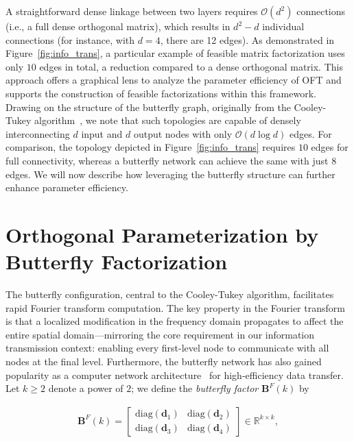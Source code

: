A straightforward dense linkage between two layers requires $\mathcal{O}(d^2)$ connections (i.e., a full dense orthogonal matrix), which results in $d^2-d$ individual connections (for instance, with $d=4$, there are 12 edges). As demonstrated in Figure~\ref{fig:info_trans}, a particular example of feasible matrix factorization uses only $10$ edges in total, a reduction compared to a dense orthogonal matrix. This approach offers a graphical lens to analyze the parameter efficiency of OFT and supports the construction of feasible factorizations within this framework. Drawing on the structure of the butterfly graph, originally from the Cooley-Tukey algorithm~\cite{cooley1965algorithm}, we note that such topologies are capable of densely interconnecting $d$ input and $d$ output nodes with only $\mathcal{O}(d\log d)$ edges. For comparison, the topology depicted in Figure~\ref{fig:info_trans} requires $10$ edges for full connectivity, whereas a butterfly network can achieve the same with just $8$ edges. We will now describe how leveraging the butterfly structure can further enhance parameter efficiency.

\section{Orthogonal Parameterization by Butterfly Factorization}

The butterfly configuration, central to the Cooley-Tukey algorithm, facilitates rapid Fourier transform computation. The key property in the Fourier transform is that a localized modification in the frequency domain propagates to affect the entire spatial domain—mirroring the core requirement in our information transmission context: enabling every first-level node to communicate with all nodes at the final level. Furthermore, the butterfly network has also gained popularity as a computer network architecture~\cite{solihin2015fundamentals,li2011linear} for high-efficiency data transfer. Let $k\geq 2$ denote a power of $2$; we define the \emph{butterfly factor} $\bm{B}^F(k)$ by

\begin{equation}\label{eq:but_factor}
\begin{aligned}
    \bm{B}^F(k)=\begin{bmatrix}
    \text{diag}(\bm{d}_1) & \text{diag}(\bm{d}_2) \\
    \text{diag}(\bm{d}_3) & \text{diag}(\bm{d}_4)
    \end{bmatrix}\in\mathbb{R}^{k\times k},
\end{aligned}
\end{equation}

